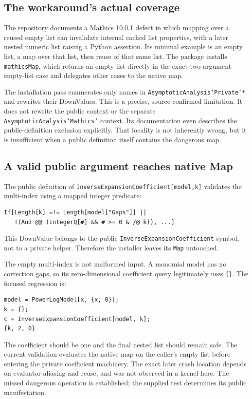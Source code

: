 \documentclass[11pt,letterpaper]{article}
\newcommand{\code}[1]{\texttt{#1}}
\begin{document}
\subsection{The workaround's actual coverage}

The repository documents a Mathics 10.0.1 defect in which mapping over a reused empty list can invalidate internal cached list properties, with a later nested numeric list raising a Python assertion. Its minimal example is an empty list, a map over that list, then reuse of that same list. The package installs \code{mathicsMap}, which returns an empty list directly in the exact two-argument empty-list case and delegates other cases to the native map.~\cite{mathics-lists,mathics-list-doc}

The installation pass enumerates only names in \code{AsymptoticAnalysis`Private`*} and rewrites their DownValues. This is a precise, source-confirmed limitation. It does not rewrite the public context or the separate \code{AsymptoticAnalysis`Mathics`} context. Its documentation even describes the public-definition exclusion explicitly. That locality is not inherently wrong, but it is insufficient when a public definition itself contains the dangerous map.

\subsection{A valid public argument reaches native Map}

The public definition of \code{InverseExpansionCoefficient[model,k]} validates the multi-index using a mapped integer predicate:
\begin{lstlisting}
If[Length[k] =!= Length[model["Gaps"]] ||
   !(And @@ (IntegerQ[#] && # >= 0 & /@ k)), ...]
\end{lstlisting}
This DownValue belongs to the public \code{InverseExpansionCoefficient} symbol, not to a private helper. Therefore the installer leaves its \code{Map} untouched.~\cite{core,mathics-lists}

The empty multi-index is not malformed input. A monomial model has no correction gaps, so its zero-dimensional coefficient query legitimately uses \code{\{\}}. The focused regression is:
\begin{lstlisting}
model = PowerLogModel[x, {x, 0}];
k = {};
c = InverseExpansionCoefficient[model, k];
{k, 2, 0}
\end{lstlisting}
The coefficient should be one and the final nested list should remain safe. The current validation evaluates the native map on the caller's empty list before entering the private coefficient machinery. The exact later crash location depends on evaluator aliasing and reuse, and was not observed in a kernel here. The missed dangerous operation is established; the supplied test determines its public manifestation.
\end{document}
